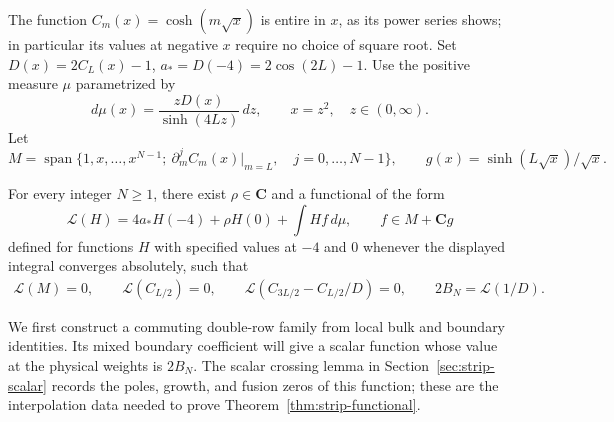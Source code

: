 The function $C_m(x)=\cosh(m\sqrt{x})$ is entire in $x$, as its power series shows; in particular its values at negative $x$ require no choice of square root. Set $D(x)=2C_L(x)-1$, $a_*=D(-4)=2\cos(2L)-1$. Use the positive measure $\mu$ parametrized by
\[
 d\mu(x)=\frac{zD(x)}{\sinh(4Lz)}\,dz,\qquad x=z^2,\quad z\in (0,\infty).
\]
Let
\[
 M=\operatorname{span}\{1,x,\ldots,x^{N-1};\ \partial_m^j C_m(x)|_{m=L},\quad j=0,\ldots,N-1\},\qquad
 g(x)=\sinh(L\sqrt{x})/\sqrt{x}.
\]
\begin{theorem}\label{thm:strip-functional}
For every integer $N\ge1$, there exist $\rho\in\mathbf C$ and a functional of the form
\[
 \mathcal L(H)=4a_* H(-4)+\rho H(0)+\int H f\,d\mu,\qquad f\in M+\mathbf C g
\]
defined for functions $H$ with specified values at $-4$ and $0$ whenever the displayed integral converges absolutely, such that
\begin{equation}
 \begin{split}
 \mathcal L(M)=0,\qquad \mathcal L(C_{L/2})=0,\qquad
 \mathcal L(C_{3L/2}-C_{L/2}/D)=0,\qquad 2 B_N=\mathcal L(1/D).
 \end{split}                                                     \label{eq:legacy-P-1}
\end{equation}
\end{theorem}
We first construct a commuting double-row family from local bulk and boundary identities. Its mixed boundary coefficient will give a scalar function whose value at the physical weights is $2B_N$. The scalar crossing lemma in Section~\ref{sec:strip-scalar} records the poles, growth, and fusion zeros of this function; these are the interpolation data needed to prove Theorem~\ref{thm:strip-functional}.

